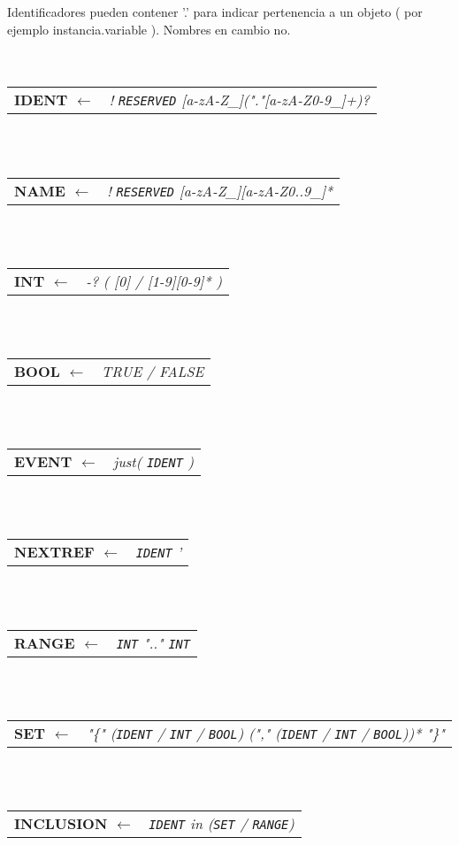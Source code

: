 \documentclass[titlepage, 12pt]{book}
\begin{document}
Identificadores pueden contener '.' para indicar pertenencia a un objeto ( por ejemplo instancia.variable ). Nombres en cambio no.\\
~\\\\
\begin{tabular}{>{\bfseries}l>{\itshape}l}
IDENT $\longleftarrow$ & ! \verb|RESERVED| [a-zA-Z\_]("."[a-zA-Z0-9\_]+)?
\end{tabular}
~\\\\
\begin{tabular}{>{\bfseries}l>{\itshape}l}
NAME $\longleftarrow$ & ! \verb|RESERVED| [a-zA-Z\_][a-zA-Z0..9\_]*
\end{tabular}
~\\\\
\begin{tabular}{>{\bfseries}l>{\itshape}l}
INT $\longleftarrow$ & -? ( [0] / [1-9][0-9]* )
\end{tabular}
~\\\\
\begin{tabular}{>{\bfseries}l>{\itshape}l}
BOOL $\longleftarrow$ & TRUE / FALSE
\end{tabular}
~\\\\
\begin{tabular}{>{\bfseries}l>{\itshape}l}
EVENT $\longleftarrow$ & just( \verb|IDENT| )
\end{tabular}
~\\\\
\begin{tabular}{>{\bfseries}l>{\itshape}l}
NEXTREF $\longleftarrow$ & \verb|IDENT| '
\end{tabular}
~\\\\
\begin{tabular}{>{\bfseries}l>{\itshape}l}
RANGE $\longleftarrow$ & \verb|INT| ".." \verb|INT|
\end{tabular}
~\\\\
\begin{tabular}{>{\bfseries}l>{\itshape}l}
SET $\longleftarrow$ & "\{" (\verb|IDENT| / \verb|INT| / \verb|BOOL|) ("," (\verb|IDENT| / \verb|INT| / \verb|BOOL|))* "\}"
\end{tabular}
~\\\\
\begin{tabular}{>{\bfseries}l>{\itshape}l}
INCLUSION $\longleftarrow$ & \verb|IDENT| in (\verb|SET| / \verb|RANGE|)
\end{tabular}
~\\\\\\
\end{document}
